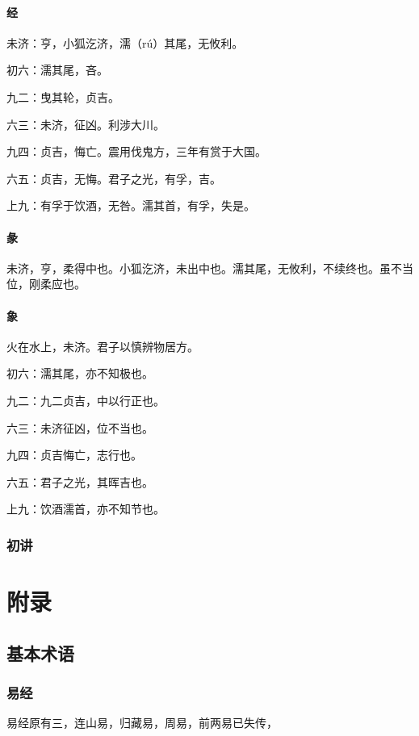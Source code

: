 \documentclass[12pt,oneside]{book}
\begin{document}
\subsection{经}
未济：亨，小狐汔济，濡（rú）其尾，无攸利。

初六：濡其尾，吝。

九二：曳其轮，贞吉。

六三：未济，征凶。利涉大川。

九四：贞吉，悔亡。震用伐鬼方，三年有赏于大国。

六五：贞吉，无悔。君子之光，有孚，吉。

上九：有孚于饮酒，无咎。濡其首，有孚，失是。

\subsection{彖}
未济，亨，柔得中也。小狐汔济，未出中也。濡其尾，无攸利，不续终也。虽不当位，刚柔应也。

\subsection{象}
火在水上，未济。君子以慎辨物居方。

初六：濡其尾，亦不知极也。

九二：九二贞吉，中以行正也。

六三：未济征凶，位不当也。

九四：贞吉悔亡，志行也。

六五：君子之光，其晖吉也。

上九：饮酒濡首，亦不知节也。

\section{初讲}








\part{附录}
\chapter{基本术语}
\section{易经}
易经原有三，连山易，归藏易，周易，前两易已失传，
\end{document}
